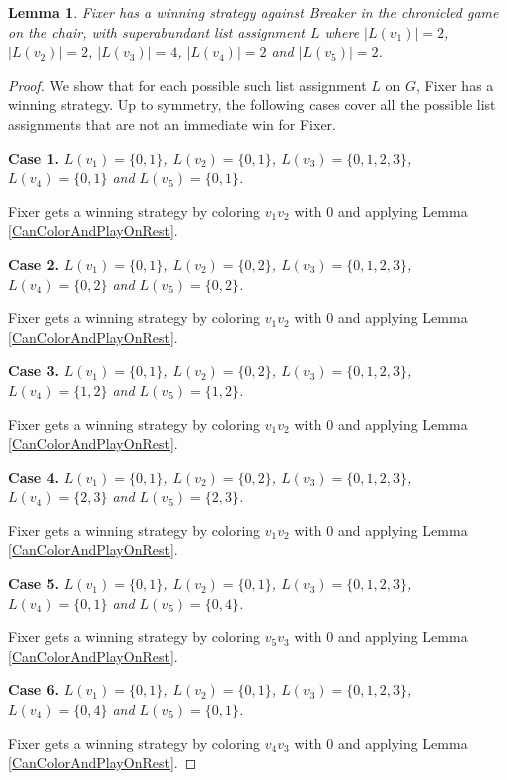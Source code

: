 \documentclass[12pt]{amsart}
\theoremstyle{plain}
\newtheorem{lem}[thm]{Lemma}
\theoremstyle{definition}
\theoremstyle{remark}
\begin{document}
\begin{lem}\label{chair2}
Fixer has a winning strategy against Breaker in the chronicled game on the chair, with superabundant list assignment $L$ where $|L(v_1)| = 2$, $|L(v_2)| = 2$, $|L(v_3)| = 4$, $|L(v_4)| = 2$ and $|L(v_5)| = 2$.
\end{lem}
\begin{proof}
We show that for each possible such list assignment $L$ on $G$, Fixer has a winning strategy.
Up to symmetry, the following cases cover all the possible list assignments that are not an immediate win for Fixer.

\noindent\textbf{Case 1.  }\textit{$L(v_1) = \{0, 1\}$, $L(v_2) = \{0, 1\}$, $L(v_3) = \{0, 1, 2, 3\}$, $L(v_4) = \{0, 1\}$ and $L(v_5) = \{0, 1\}$.}

Fixer gets a winning strategy by coloring $v_1v_2$ with $0$ and applying Lemma \ref{CanColorAndPlayOnRest}.

\noindent\textbf{Case 2.  }\textit{$L(v_1) = \{0, 1\}$, $L(v_2) = \{0, 2\}$, $L(v_3) = \{0, 1, 2, 3\}$, $L(v_4) = \{0, 2\}$ and $L(v_5) = \{0, 2\}$.}

Fixer gets a winning strategy by coloring $v_1v_2$ with $0$ and applying Lemma \ref{CanColorAndPlayOnRest}.

\noindent\textbf{Case 3.  }\textit{$L(v_1) = \{0, 1\}$, $L(v_2) = \{0, 2\}$, $L(v_3) = \{0, 1, 2, 3\}$, $L(v_4) = \{1, 2\}$ and $L(v_5) = \{1, 2\}$.}

Fixer gets a winning strategy by coloring $v_1v_2$ with $0$ and applying Lemma \ref{CanColorAndPlayOnRest}.

\noindent\textbf{Case 4.  }\textit{$L(v_1) = \{0, 1\}$, $L(v_2) = \{0, 2\}$, $L(v_3) = \{0, 1, 2, 3\}$, $L(v_4) = \{2, 3\}$ and $L(v_5) = \{2, 3\}$.}

Fixer gets a winning strategy by coloring $v_1v_2$ with $0$ and applying Lemma \ref{CanColorAndPlayOnRest}.

\noindent\textbf{Case 5.  }\textit{$L(v_1) = \{0, 1\}$, $L(v_2) = \{0, 1\}$, $L(v_3) = \{0, 1, 2, 3\}$, $L(v_4) = \{0, 1\}$ and $L(v_5) = \{0, 4\}$.}

Fixer gets a winning strategy by coloring $v_5v_3$ with $0$ and applying Lemma \ref{CanColorAndPlayOnRest}.

\noindent\textbf{Case 6.  }\textit{$L(v_1) = \{0, 1\}$, $L(v_2) = \{0, 1\}$, $L(v_3) = \{0, 1, 2, 3\}$, $L(v_4) = \{0, 4\}$ and $L(v_5) = \{0, 1\}$.}

Fixer gets a winning strategy by coloring $v_4v_3$ with $0$ and applying Lemma \ref{CanColorAndPlayOnRest}.


\end{proof}
\end{document}
